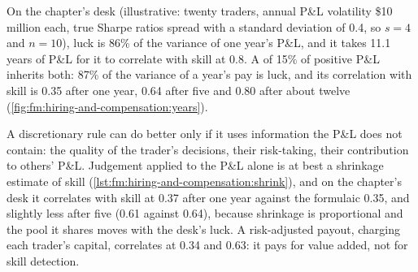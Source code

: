 On the chapter's desk (illustrative: twenty traders, annual P\&L volatility \$10 million each, true Sharpe ratios spread with a standard deviation
of 0.4, so $s=4$ and $n=10$), luck is 86\% of the variance of one year's P\&L, and it takes 11.1 years of P\&L for it to correlate with skill at 0.8.
A  of 15\% of positive P\&L inherits both: 87\% of the variance of a year's pay is luck, and its correlation with skill is 0.35 after
one year, 0.64 after five and 0.80 after about twelve (\cref{fig:fm:hiring-and-compensation:years}).

\begin{omfigure}

\label{fig:fm:hiring-and-compensation:years}
\end{omfigure}

A discretionary rule can do better only if it uses information the P\&L does not contain: the quality of the trader's decisions, their risk-taking,
their contribution to others' P\&L. Judgement applied to the P\&L alone is at best a shrinkage estimate of skill
(\cref{lst:fm:hiring-and-compensation:shrink}), and on the chapter's desk it correlates with skill at 0.37 after one year against the formulaic 0.35,
and slightly less after five (0.61 against 0.64), because shrinkage is proportional and the pool it shares moves with the desk's luck. A
risk-adjusted payout, charging each trader's capital, correlates at 0.34 and 0.63: it pays for value added, not for skill detection.

